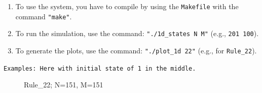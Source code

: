 \documentclass[12pt,a4paper]{article}
\begin{document}
\begin{enumerate}[label=\roman*.]
    \item 
    To use the system, you have to compile by using the \texttt{Makefile} with the command \texttt{"make"}.
    \newline
    \vspace{0.1 cm}

    \item 
    To run the simulation, use the command: \texttt{"./1d\_states N M"} (e.g., \texttt{201 100}).
    \newline
    \vspace{0.1 cm}

    \item 
    To generate the plots, use the command: \texttt{"./plot\_1d 22"} (e.g., for \texttt{Rule\_22}).
\end{enumerate} 

\vspace{3.5 cm}
\texttt{Examples: Here with initial state of 1 in the middle.}  
\newline


\begin{figure}[H]
    \centering
    \caption{Rule\_22; N=151, M=151}
    \label{fig:your_label}
\end{figure}

\vspace{0.5cm}
\end{document}
